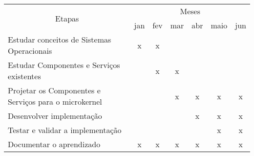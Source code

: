 \documentclass[12pt]{article}
\begin{document}
\begin{tabularx}{\linewidth}{|X|*{6}{c|}}
	\hline
	\multicolumn{1}{|c|}{\multirow{2}{*}{Etapas}} & \multicolumn{6}{|c|}{Meses}\\ \cline{2-7}
	& jan & fev & mar & abr & maio & jun \\ \hline

	Estudar conceitos de Sistemas Operacionais
	&  x  &  x  &     &     &     &     \\ \hline

	Estudar Componentes e Serviços existentes
	&     &  x  &  x  &     &     &     \\ \hline

	Projetar os Componentes e Serviços para o microkernel
	&     &     &  x  &  x  &  x  &  x  \\ \hline

	Desenvolver implementação
	&     &     &     &  x  &  x  &  x  \\ \hline

	Testar e validar a implementação
	&     &     &     &     &  x  &  x  \\ \hline

	Documentar o aprendizado
	&  x  &  x  &  x  &  x  &  x  &  x  \\ \hline

\end{tabularx}




\end{document}
